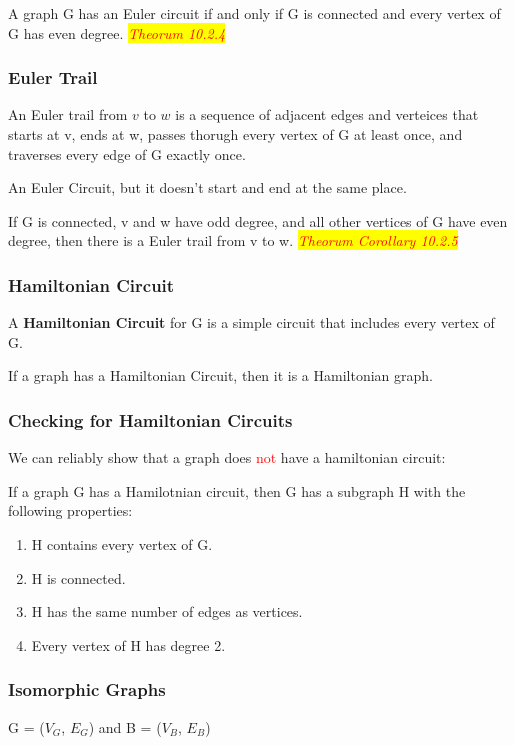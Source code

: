 \documentclass{article}
\newcommand{\theorum}[1]{\quad \quad \colorbox{yellow}{\textit{\textcolor{red}{Theorum #1}}}}
\newcommand{\sbreak}{\vspace{10pt}}
\begin{document}
\sbreak

A graph G has an Euler circuit if and only if G is connected and every vertex of G has even degree. \theorum{10.2.4}

\subsubsection{Euler Trail}
An Euler trail from $v$ to $w$ is a sequence of adjacent edges and verteices that starts at v, ends at w, passes thorugh every vertex of G at least once, and traverses every edge of G exactly once.

An Euler Circuit, but it doesn't start and end at the same place.

\sbreak

If G is connected, v and w have odd degree, and all other vertices of G have even degree, then there is a Euler trail from v to w. \theorum{Corollary 10.2.5}

\subsubsection{Hamiltonian Circuit}
A \textbf{Hamiltonian Circuit} for G is a simple circuit that includes every vertex of G.

If a graph has a Hamiltonian Circuit, then it is a Hamiltonian graph.

\subsubsection{Checking for Hamiltonian Circuits}
We can reliably show that a graph does \textcolor{red}{not} have a hamiltonian circuit:

If a graph G has a Hamilotnian circuit, then G has a subgraph H with the following properties:
\begin{enumerate}
    \item H contains every vertex of G.
    \item H is connected.
    \item H has the same number of edges as vertices.
    \item Every vertex of H has degree 2.
\end{enumerate}

\subsubsection{Isomorphic Graphs}
G = ($V_G$, $E_G$) and B = ($V_B$, $E_B$)
\end{document}
